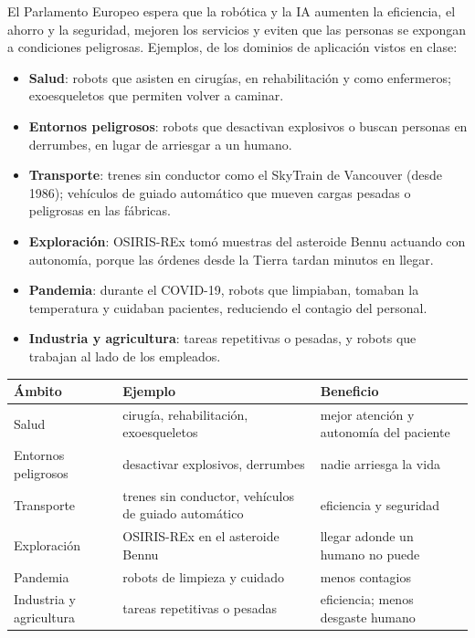 \documentclass[11pt,a4paper]{article}
\begin{document}
El Parlamento Europeo espera que la robótica y la IA aumenten la eficiencia, el ahorro y la seguridad, mejoren los servicios y eviten que las personas se expongan a condiciones peligrosas. Ejemplos, de los dominios de aplicación vistos en clase:
\begin{itemize}
  \item \textbf{Salud}: robots que asisten en cirugías, en rehabilitación y como enfermeros; exoesqueletos que permiten volver a caminar.
  \item \textbf{Entornos peligrosos}: robots que desactivan explosivos o buscan personas en derrumbes, en lugar de arriesgar a un humano.
  \item \textbf{Transporte}: trenes sin conductor como el SkyTrain de Vancouver (desde 1986); vehículos de guiado automático que mueven cargas pesadas o peligrosas en las fábricas.
  \item \textbf{Exploración}: OSIRIS-REx tomó muestras del asteroide Bennu actuando con autonomía, porque las órdenes desde la Tierra tardan minutos en llegar.
  \item \textbf{Pandemia}: durante el COVID-19, robots que limpiaban, tomaban la temperatura y cuidaban pacientes, reduciendo el contagio del personal.
  \item \textbf{Industria y agricultura}: tareas repetitivas o pesadas, y robots que trabajan al lado de los empleados.
\end{itemize}

\begin{center}
\small
\begin{tabularx}{\linewidth}{@{}l X X@{}}
\toprule
\textbf{Ámbito} & \textbf{Ejemplo} & \textbf{Beneficio} \\
\midrule
Salud & cirugía, rehabilitación, exoesqueletos & mejor atención y autonomía del paciente \\
Entornos peligrosos & desactivar explosivos, derrumbes & nadie arriesga la vida \\
Transporte & trenes sin conductor, vehículos de guiado automático & eficiencia y seguridad \\
Exploración & OSIRIS-REx en el asteroide Bennu & llegar adonde un humano no puede \\
Pandemia & robots de limpieza y cuidado & menos contagios \\
Industria y agricultura & tareas repetitivas o pesadas & eficiencia; menos desgaste humano \\
\bottomrule
\end{tabularx}
\end{center}
\end{document}
